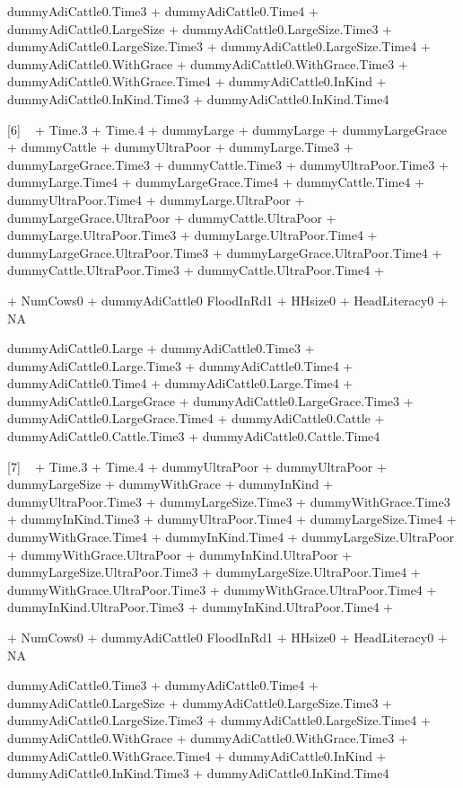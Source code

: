 \begin{Schunk}
\begin{Soutput}
dummyAdiCattle0.Time3 + dummyAdiCattle0.Time4 + dummyAdiCattle0.LargeSize + dummyAdiCattle0.LargeSize.Time3
 + dummyAdiCattle0.LargeSize.Time3 + dummyAdiCattle0.LargeSize.Time4 + dummyAdiCattle0.WithGrace
 + dummyAdiCattle0.WithGrace.Time3 + dummyAdiCattle0.WithGrace.Time4 + dummyAdiCattle0.InKind
 + dummyAdiCattle0.InKind.Time3 + dummyAdiCattle0.InKind.Time4

 

[6]
 ~  + Time.3 + Time.4 + dummyLarge
 + dummyLarge + dummyLargeGrace + dummyCattle
 + dummyUltraPoor + dummyLarge.Time3 + dummyLargeGrace.Time3
 + dummyCattle.Time3 + dummyUltraPoor.Time3 + dummyLarge.Time4
 + dummyLargeGrace.Time4 + dummyCattle.Time4 + dummyUltraPoor.Time4
 + dummyLarge.UltraPoor + dummyLargeGrace.UltraPoor + dummyCattle.UltraPoor
 + dummyLarge.UltraPoor.Time3 + dummyLarge.UltraPoor.Time4 + dummyLargeGrace.UltraPoor.Time3
 + dummyLargeGrace.UltraPoor.Time4 + dummyCattle.UltraPoor.Time3 + dummyCattle.UltraPoor.Time4
 + 

 + NumCows0
 + dummyAdiCattle0
FloodInRd1 + HHsize0 + HeadLiteracy0 + NA

dummyAdiCattle0.Large + dummyAdiCattle0.Time3 + dummyAdiCattle0.Large.Time3 + dummyAdiCattle0.Time4
 + dummyAdiCattle0.Time4 + dummyAdiCattle0.Large.Time4 + dummyAdiCattle0.LargeGrace
 + dummyAdiCattle0.LargeGrace.Time3 + dummyAdiCattle0.LargeGrace.Time4 + dummyAdiCattle0.Cattle
 + dummyAdiCattle0.Cattle.Time3 + dummyAdiCattle0.Cattle.Time4

 

[7]
 ~  + Time.3 + Time.4 + dummyUltraPoor
 + dummyUltraPoor + dummyLargeSize + dummyWithGrace
 + dummyInKind + dummyUltraPoor.Time3 + dummyLargeSize.Time3
 + dummyWithGrace.Time3 + dummyInKind.Time3 + dummyUltraPoor.Time4
 + dummyLargeSize.Time4 + dummyWithGrace.Time4 + dummyInKind.Time4
 + dummyLargeSize.UltraPoor + dummyWithGrace.UltraPoor + dummyInKind.UltraPoor
 + dummyLargeSize.UltraPoor.Time3 + dummyLargeSize.UltraPoor.Time4 + dummyWithGrace.UltraPoor.Time3
 + dummyWithGrace.UltraPoor.Time4 + dummyInKind.UltraPoor.Time3 + dummyInKind.UltraPoor.Time4
 + 

 + NumCows0
 + dummyAdiCattle0
FloodInRd1 + HHsize0 + HeadLiteracy0 + NA

dummyAdiCattle0.Time3 + dummyAdiCattle0.Time4 + dummyAdiCattle0.LargeSize + dummyAdiCattle0.LargeSize.Time3
 + dummyAdiCattle0.LargeSize.Time3 + dummyAdiCattle0.LargeSize.Time4 + dummyAdiCattle0.WithGrace
 + dummyAdiCattle0.WithGrace.Time3 + dummyAdiCattle0.WithGrace.Time4 + dummyAdiCattle0.InKind
 + dummyAdiCattle0.InKind.Time3 + dummyAdiCattle0.InKind.Time4

 
\end{Soutput}
\end{Schunk}
